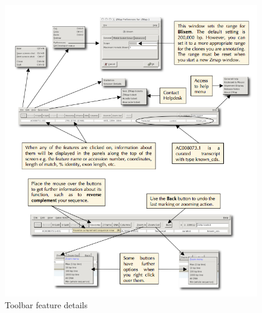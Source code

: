\documentclass[letterpaper]{article}
\begin{document}
\begin{figure}
\centering
\color[rgb]{0.30980393,0.5058824,0.7411765}
\includegraphics[width=15.231cm]{img_toolbar_feature_details.png}
\caption{Toolbar feature details}
\label{img_toolbar_feature_details}
\end{figure}
\end{document}
